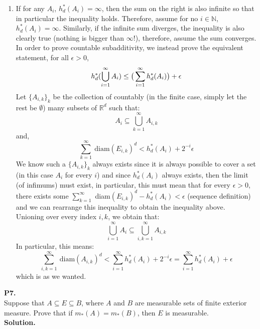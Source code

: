 \documentclass{article}
\begin{document}
\begin{enumerate}
        \item If for any $A_i$, $h_d^*(A_i) = \infty$, then the sum on the right is also infinite so that in particular the inequality
            holds. Therefore, assume for no $i\in\mathbb{N}$, $h_d^*(A_i) = \infty$. Similarly, if the infinite sum diverges, the
            inequality is also clearly true (nothing is bigger than $\infty$!), therefore, assume the sum converges. In order
            to prove countable subadditivity, we instead prove the equivalent statement, for all $\epsilon>0$,
            \[ h_d^*(\bigcup_{i=1}^{\infty} A_i) \leq \big{(}\sum_{i=1}^{\infty} h_d^*(A_i)\big{)} + \epsilon \]
            Let $\{A_{i,k}\}_k$ be the collection of countably (in the finite case, simply let the rest be $\emptyset$) many
            subsets of $\mathbb{R}^d$ such that:
            \[ A_i \subseteq \bigcup_{k=1}^{\infty} A_{i,k} \]
            and,
            \[ \sum_{k=1}^{\infty}\:\text{diam}(E_{i,k})^d < h_d^*(A_i) + 2^{-i}\epsilon \]
            We know such a $\{A_{i,k}\}_k$ always exists since it is always possible to cover a set (in this case $A_i$ for every
            $i$) and since $h_d^*(A_i)$ always exists, then the limit (of infimums) must exist, in particular, this must mean
            that for every $\epsilon>0$, there exists some $\sum_{k=1}^{\infty}$ diam$(E_{i,k})^d - h_d^*(A_i) < \epsilon$ (sequence
            definition) and we can rearrange this inequality to obtain the inequality above.\\
            Unioning over every index $i,k$, we obtain that:
            \[ \bigcup_{i=1}^{\infty} A_i \subseteq \bigcup_{i,k=1}^{\infty} A_{i,k} \]
            In particular, this means:
            \[ \sum_{i,k=1}^{\infty}\:\text{diam}(A_{i,k})^d < \sum_{i=1}^{\infty} h_d^*(A_i) + 2^{-i}\epsilon = \sum_{i=1}^{\infty} 
                h_d^*(A_i) + \epsilon \]
            which is as we wanted.
    \end{enumerate}

    \textbf{P7.} \\

    Suppose that $A\subseteq E\subseteq B$, where $A$ and $B$ are measurable sets of finite exterior measure. Prove that if
    $m_*(A) = m_*(B)$, then $E$ is measurable.\\

    \textbf{Solution.}\\
\end{document}
